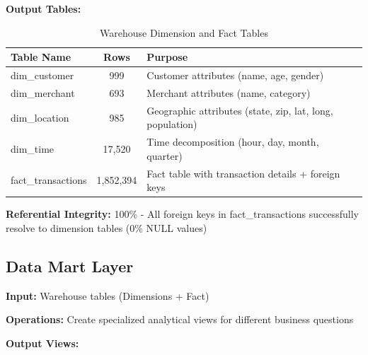 \textbf{Output Tables:}

\begin{table}[H]
\centering
\begin{tabular}{|l|c|l|}
\hline
\textbf{Table Name} & \textbf{Rows} & \textbf{Purpose} \\
\hline
dim\_customer & 999 & Customer attributes (name, age, gender) \\
dim\_merchant & 693 & Merchant attributes (name, category) \\
dim\_location & 985 & Geographic attributes (state, zip, lat, long, population) \\
dim\_time & 17,520 & Time decomposition (hour, day, month, quarter) \\
fact\_transactions & 1,852,394 & Fact table with transaction details + foreign keys \\
\hline
\end{tabular}
\caption{Warehouse Dimension and Fact Tables}
\label{tab:warehouse_tables}
\end{table}

\textbf{Referential Integrity:} 100\% - All foreign keys in fact\_transactions successfully resolve to dimension tables (0\% NULL values)

\vspace{0.5cm}

\subsection{Data Mart Layer}

\textbf{Input:} Warehouse tables (Dimensions + Fact)

\textbf{Operations:} Create specialized analytical views for different business questions

\textbf{Output Views:}

